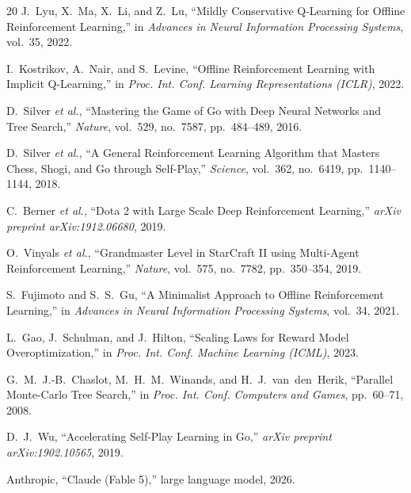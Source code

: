 \documentclass[journal]{IEEEtran}
\begin{document}
\begin{thebibliography}{20}
J.~Lyu, X.~Ma, X.~Li, and Z.~Lu, ``Mildly Conservative Q-Learning for Offline Reinforcement Learning,'' in \textit{Advances in Neural Information Processing Systems}, vol.~35, 2022.

I.~Kostrikov, A.~Nair, and S.~Levine, ``Offline Reinforcement Learning with Implicit Q-Learning,'' in \textit{Proc. Int. Conf. Learning Representations (ICLR)}, 2022.

D.~Silver \textit{et al.}, ``Mastering the Game of Go with Deep Neural Networks and Tree Search,'' \textit{Nature}, vol.~529, no.~7587, pp.~484--489, 2016.

D.~Silver \textit{et al.}, ``A General Reinforcement Learning Algorithm that Masters Chess, Shogi, and Go through Self-Play,'' \textit{Science}, vol.~362, no.~6419, pp.~1140--1144, 2018.

C.~Berner \textit{et al.}, ``Dota 2 with Large Scale Deep Reinforcement Learning,'' \textit{arXiv preprint arXiv:1912.06680}, 2019.

O.~Vinyals \textit{et al.}, ``Grandmaster Level in StarCraft II using Multi-Agent Reinforcement Learning,'' \textit{Nature}, vol.~575, no.~7782, pp.~350--354, 2019.

S.~Fujimoto and S.~S.~Gu, ``A Minimalist Approach to Offline Reinforcement Learning,'' in \textit{Advances in Neural Information Processing Systems}, vol.~34, 2021.

L.~Gao, J.~Schulman, and J.~Hilton, ``Scaling Laws for Reward Model Overoptimization,'' in \textit{Proc. Int. Conf. Machine Learning (ICML)}, 2023.

G.~M.~J.-B.~Chaslot, M.~H.~M.~Winands, and H.~J.~van~den~Herik, ``Parallel Monte-Carlo Tree Search,'' in \textit{Proc. Int. Conf. Computers and Games}, pp.~60--71, 2008.

D.~J.~Wu, ``Accelerating Self-Play Learning in Go,'' \textit{arXiv preprint arXiv:1902.10565}, 2019.

Anthropic, ``Claude (Fable 5),'' large language model, 2026.


\end{thebibliography}
\end{document}

